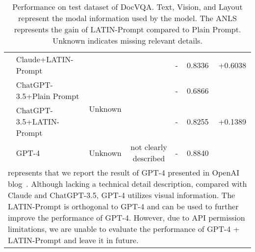 \documentclass[letterpaper]{article} \usepackage{aaai24_preprint}  \usepackage{times}  \usepackage{helvet}  \usepackage{courier}  \usepackage[hyphens]{url}  \usepackage{graphicx} \urlstyle{rm} \def\UrlFont{\rm}  \usepackage{natbib}  \usepackage{caption} \frenchspacing  \setlength{\pdfpagewidth}{8.5in} \setlength{\pdfpageheight}{11in} \usepackage{algorithm}
\begin{document}
\begin{table*}[t]
\begin{tabular}{@{}clccccccc@{}}
                              & Claude+LATIN-Prompt                    &                          &  &              &  & -               & 0.8336 & +0.6038      \\ \cmidrule(l){2-9} 
                              & ChatGPT-3.5+Plain Prompt                   & \multirow{2}{*}{Unknown} &  &              &  & -               & 0.6866 &              \\
                              & ChatGPT-3.5+LATIN-Prompt                   &                          &  &              &  & -               & 0.8255 & +0.1389      \\ \cmidrule(l){2-9} 
                              & GPT-4                              & Unknown                  & \multicolumn{3}{c}{not clearly described}  & -               & 0.8840 &              \\ \bottomrule
\multicolumn{9}{l}{\parbox[c]{16cm}{\small* represents that we report the result of GPT-4 presented in OpenAI blog~\cite{OpenAIGPT4Blog2023}.
Although lacking a technical detail description, compared with Claude and ChatGPT-3.5, GPT-4 utilizes visual information.
The LATIN-Prompt is orthogonal to GPT-4 and can be used to further improve the performance of GPT-4. However, due to API permission limitations, we are unable to evaluate the performance of GPT-4 + LATIN-Prompt and leave it in future.}}
\end{tabular}
\caption{
Performance on test dataset of DocVQA.
Text, Vision, and Layout represent the modal information used by the model.
The ANLS represents the gain of LATIN-Prompt compared to Plain Prompt.
Unknown indicates missing relevant details.
}
\label{tab:exp_docvqa}
\end{table*}
\end{document}

